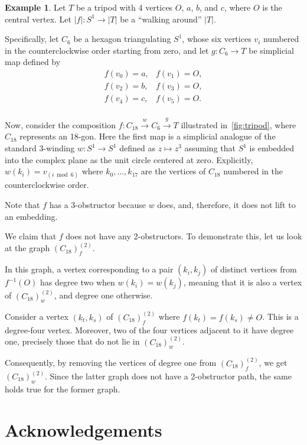 \documentclass[a4paper,12pt,reqno,oneside]{amsart}
\theoremstyle{plain}
\theoremstyle{definition}
\newtheorem{example}{Example}
\theoremstyle{plain}
\newcommand{\from}{\colon}
\newcommand{\xto}[1]{\xrightarrow{#1}}
\begin{document}
\begin{example}
  Let $T$ be a tripod with 4 vertices $O$, $a$, $b$, and $c$, where $O$ is the central vertex. Let
  $|f| \from S^1 \to |T|$ be a ``walking around'' $|T|$.

  Specifically, let $C_6$ be a hexagon triangulating $S^1$, whose six vertices $v_i$ numbered in
  the counterclockwise order starting from zero, and let $g \from C_6 \to T$ be simplicial map defined by
  \[
    \begin{array}{lr}
      f(v_0) = a, & f(v_1) = O, \\
      f(v_2) = b, & f(v_3) = O, \\
      f(v_4) = c, & f(v_5) = O. \\
    \end{array}
  \]

  Now, consider the composition $f \from C_{18} \xto{w} C_6 \xto{g} T$ illustrated
  in~\cref{fig:tripod}, where $C_{18}$ represents an 18-gon. Here the first map is a simplicial analogue
  of the standard 3-winding $w \from S^1 \to S^1$ defined as $z \mapsto z^3$ assuming that $S^1$ is
  embedded into the complex plane as the unit circle centered at zero. Explicitly,
  $w(k_i) = v_{\left(i \bmod 6\right)}$ where $k_0, \dots, k_{17}$ are the vertices of $C_{18}$
  numbered in the counterclockwise order.

  Note that $f$ has a 3-obstructor because $w$ does, and, therefore, it does not lift to an
  embedding.

  We claim that $f$ does not have any 2-obstructors. To demonstrate this, let us look at the graph
  $(C_{18})_f^{(2)}$.

  In this graph, a vertex corresponding to a pair $(k_i, k_j)$ of distinct vertices from $f^{-1}(O)$
  has degree two when $w(k_i) = w(k_j)$, meaning that it is also a vertex of $(C_{18})_w^{(2)}$, and
  degree one otherwise.

  Consider a vertex $(k_t, k_s)$ of $(C_{18})_f^{(2)}$ where $f(k_t) = f(k_s) \neq O$. This is a
  degree-four vertex. Moreover, two of the four vertices adjacent to it have degree one, precisely
  those that do not lie in $(C_{18})_w^{(2)}$.

  Consequently, by removing the vertices of degree one from $(C_{18})_f^{(2)}$, we get
  $(C_{18})_w^{(2)}$. Since the latter graph does not have a 2-obstructor path, the same holds true
  for the former graph.
\end{example}

\section*{Acknowledgements}
\end{document}
